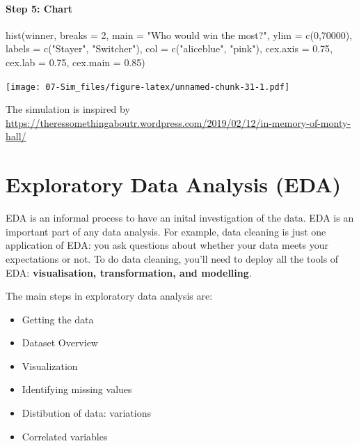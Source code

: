 \documentclass[
]{book}
\newenvironment{Shaded}{\begin{snugshade}}{\end{snugshade}}
\newcommand{\AttributeTok}[1]{\textcolor[rgb]{0.77,0.63,0.00}{#1}}
\newcommand{\DecValTok}[1]{\textcolor[rgb]{0.00,0.00,0.81}{#1}}
\newcommand{\FloatTok}[1]{\textcolor[rgb]{0.00,0.00,0.81}{#1}}
\newcommand{\FunctionTok}[1]{\textcolor[rgb]{0.00,0.00,0.00}{#1}}
\newcommand{\NormalTok}[1]{#1}
\newcommand{\StringTok}[1]{\textcolor[rgb]{0.31,0.60,0.02}{#1}}
\providecommand{\tightlist}{%
  \setlength{\itemsep}{0pt}\setlength{\parskip}{0pt}}
\begin{document}
\hypertarget{step-5-chart}{%
\subsubsection*{Step 5: Chart}\label{step-5-chart}}

\begin{Shaded}
\begin{Highlighting}[]
\FunctionTok{hist}\NormalTok{(winner, }\AttributeTok{breaks =} \DecValTok{2}\NormalTok{, }\AttributeTok{main =} \StringTok{"Who would win the most?"}\NormalTok{,}
     \AttributeTok{ylim =} \FunctionTok{c}\NormalTok{(}\DecValTok{0}\NormalTok{,}\DecValTok{70000}\NormalTok{), }\AttributeTok{labels =} \FunctionTok{c}\NormalTok{(}\StringTok{"Stayer"}\NormalTok{, }\StringTok{"Switcher"}\NormalTok{),}
     \AttributeTok{col =} \FunctionTok{c}\NormalTok{(}\StringTok{"aliceblue"}\NormalTok{, }\StringTok{"pink"}\NormalTok{),}
     \AttributeTok{cex.axis =} \FloatTok{0.75}\NormalTok{, }\AttributeTok{cex.lab =} \FloatTok{0.75}\NormalTok{, }\AttributeTok{cex.main =} \FloatTok{0.85}\NormalTok{)}
\end{Highlighting}
\end{Shaded}

\texttt{[image: 07-Sim\_files/figure-latex/unnamed-chunk-31-1.pdf]}

The simulation is inspired by \url{https://theressomethingaboutr.wordpress.com/2019/02/12/in-memory-of-monty-hall/} \citep{Rajter_2019}

\hypertarget{exploratory-data-analysis-eda}{%
\chapter{Exploratory Data Analysis (EDA)}\label{exploratory-data-analysis-eda}}

EDA is an informal process to have an inital investigation of the data. EDA is an important part of any data analysis. For example, data cleaning is just one application of EDA: you ask questions about whether your data meets your expectations or not. To do data cleaning, you'll need to deploy all the tools of EDA: \textbf{visualisation, transformation, and modelling}.

The main steps in exploratory data analysis are:

\begin{itemize}
\tightlist
\item
  Getting the data
\item
  Dataset Overview
\item
  Visualization
\item
  Identifying missing values
\item
  Distibution of data: variations
\item
  Correlated variables
\end{itemize}
\end{document}
